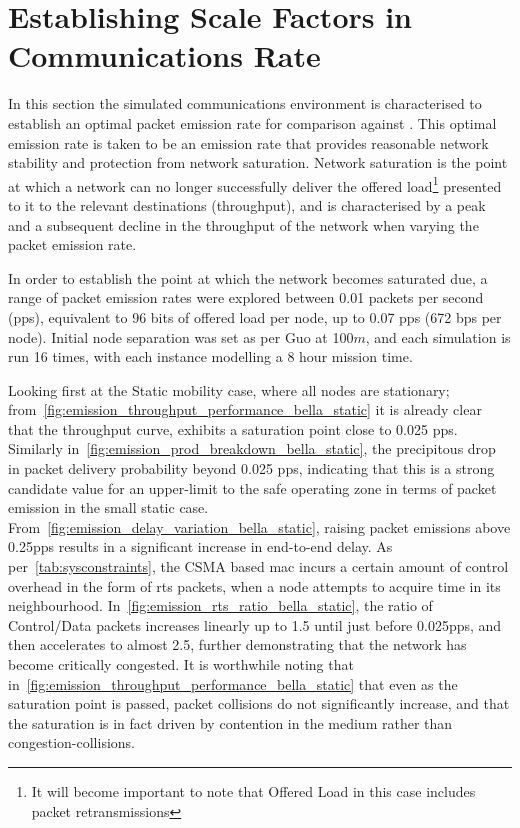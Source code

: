 \section{Establishing Scale Factors in Communications Rate}

In this section the simulated communications environment is characterised to establish an optimal packet emission rate for comparison against \cite{Guo11}.
This optimal emission rate is taken to be an emission rate that provides reasonable network stability and protection from network saturation.
Network saturation is the point at which a network can no longer successfully deliver the offered load\footnote{It will become important to note that Offered Load in this case includes packet retransmissions} presented to it to the relevant destinations (throughput), and is characterised by a peak and a subsequent decline in the throughput of the network when varying the packet emission rate. 

In order to establish the point at which the network becomes saturated due, a range of packet emission rates were explored between 0.01 packets per second (pps), equivalent to 96 bits of offered load per node, up to 0.07 pps (672 bps per node).
Initial node separation was set as per Guo at 100$m$, and each simulation is run 16 times, with each instance modelling a 8 hour mission time.

Looking first at the Static mobility case, where all nodes are stationary; from~\autoref{fig:emission_throughput_performance_bella_static} it is already clear that the throughput curve, exhibits a saturation point close to 0.025 pps.
Similarly in~\autoref{fig:emission_prod_breakdown_bella_static}, the precipitous drop in packet delivery probability beyond 0.025 pps, indicating that this is a strong candidate value for an upper-limit to the safe operating zone in terms of packet emission in the small static case.
From~\autoref{fig:emission_delay_variation_bella_static}, raising packet emissions above 0.25pps results in a significant increase in end-to-end delay.
As per~\autoref{tab:sysconstraints}, the CSMA based \gls{mac} incurs a certain amount of control overhead in the form of \gls{rts} packets, when a node attempts to acquire time in its neighbourhood.
In~\autoref{fig:emission_rts_ratio_bella_static}, the ratio of Control/Data packets increases linearly up to 1.5 until just before 0.025pps, and then accelerates to almost 2.5, further demonstrating that the network has become critically congested.
It is worthwhile noting that in~\autoref{fig:emission_throughput_performance_bella_static} that even as the saturation point is passed, packet collisions do not significantly increase, and that the saturation is in fact driven by contention in the medium rather than congestion-collisions.


